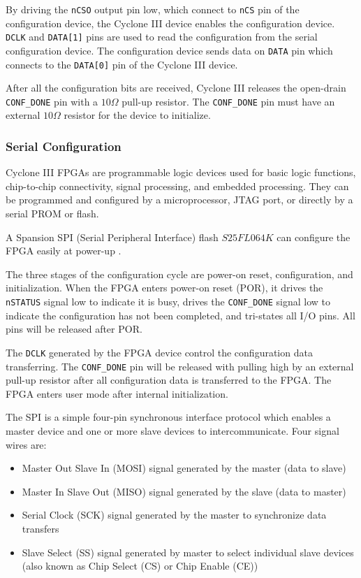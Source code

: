 By driving the \texttt{nCSO} output pin low, which connect to \texttt{nCS} pin of the configuration device,
the Cyclone III device enables the configuration device.  \texttt{DCLK} and \texttt{DATA[1]} pins are used
to read the configuration from the serial configuration device. The configuration device sends data
on \texttt{DATA} pin which connects to the \texttt{DATA[0]} pin of the Cyclone III device.

After all the configuration bits are received, Cyclone III releases the open-drain \texttt{CONF\_DONE} pin with a $10\Omega$ pull-up resistor. The
\texttt{CONF\_DONE} pin must have an external $10\Omega$ resistor for the device to initialize.


\subsubsection{Serial Configuration}

Cyclone III FPGAs are programmable logic devices used for basic logic functions,
chip-to-chip connectivity, signal processing, and embedded processing. They can
be programmed and configured by a microprocessor, JTAG port, or directly by a
serial PROM or flash.

A Spansion SPI (Serial Peripheral Interface) flash $S25FL064K$ can configure the FPGA easily at power-up \citep{Spansion:2011:appnote}.

The three stages of the configuration cycle are power-on reset, configuration, and initialization.
When the FPGA enters power-on reset (POR), it drives the \texttt{nSTATUS} signal low to indicate it is busy,
drives the \texttt{CONF\_DONE} signal low to indicate the configuration has not been completed, and tri-states all I/O pins.
All pins will be released after POR.

The \texttt{DCLK} generated by the FPGA device control the configuration data transferring.
The \texttt{CONF\_DONE} pin will be released with pulling high by an external pull-up
resistor after all configuration data is transferred to the FPGA. The FPGA enters user mode after internal initialization.

The SPI is a simple four-pin synchronous interface protocol which enables a master device and one or more slave devices to intercommunicate. Four signal wires are:
\begin{itemize}
 \item Master Out Slave In (MOSI) signal generated by the master (data to slave)
 \item Master In Slave Out (MISO) signal generated by the slave (data to master)
 \item Serial Clock (SCK) signal generated by the master to synchronize data transfers
 \item Slave Select (SS) signal generated by master to select individual slave devices (also known as Chip Select (CS) or Chip Enable (CE))
\end{itemize}


